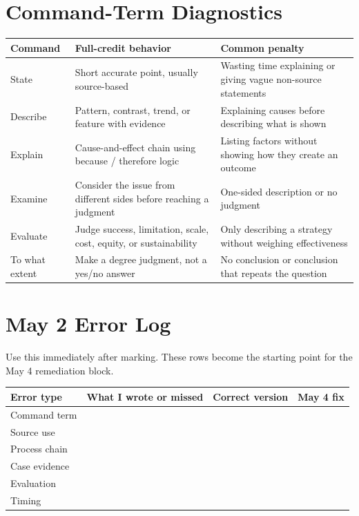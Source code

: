 \documentclass[11pt,a4paper]{article}
\begin{document}
\section{Command-Term Diagnostics}

\begin{tabularx}{\textwidth}{L{0.18\textwidth}Y Y}
\toprule
\textbf{Command} & \textbf{Full-credit behavior} & \textbf{Common penalty} \\
\midrule
State & Short accurate point, usually source-based & Wasting time explaining or
giving vague non-source statements \\
Describe & Pattern, contrast, trend, or feature with evidence & Explaining
causes before describing what is shown \\
Explain & Cause-and-effect chain using because / therefore logic & Listing
factors without showing how they create an outcome \\
Examine & Consider the issue from different sides before reaching a judgment &
One-sided description or no judgment \\
Evaluate & Judge success, limitation, scale, cost, equity, or sustainability &
Only describing a strategy without weighing effectiveness \\
To what extent & Make a degree judgment, not a yes/no answer & No conclusion or
conclusion that repeats the question \\
\bottomrule
\end{tabularx}

\section{May 2 Error Log}

Use this immediately after marking. These rows become the starting point for
the May 4 remediation block.

\begin{tabularx}{\textwidth}{L{0.17\textwidth}Y Y Y}
\toprule
\textbf{Error type} & \textbf{What I wrote or missed} & \textbf{Correct version} & \textbf{May 4 fix} \\
\midrule
Command term & \rule{0pt}{1.45cm} & & \\
Source use & \rule{0pt}{1.45cm} & & \\
Process chain & \rule{0pt}{1.45cm} & & \\
Case evidence & \rule{0pt}{1.45cm} & & \\
Evaluation & \rule{0pt}{1.45cm} & & \\
Timing & \rule{0pt}{1.45cm} & & \\
\bottomrule
\end{tabularx}
\end{document}
